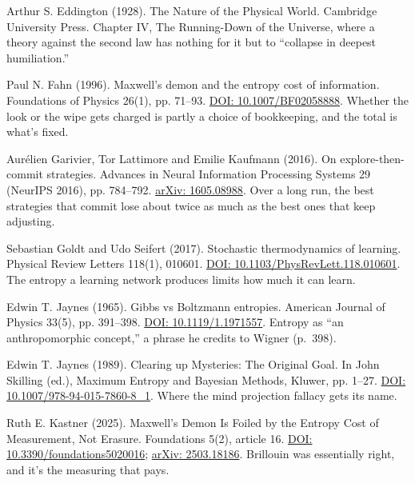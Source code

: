 \noindent Arthur S. Eddington (1928). The Nature of the Physical World. Cambridge University Press. Chapter IV, The Running-Down of the Universe, where a theory against the second law has nothing for it but to ``collapse in deepest humiliation.''
\par\medskip

\noindent Paul N. Fahn (1996). Maxwell's demon and the entropy cost of information. Foundations of Physics 26(1), pp. 71--93. \href{https://doi.org/10.1007/BF02058888}{DOI: 10.1007/BF02058888}. Whether the look or the wipe gets charged is partly a choice of bookkeeping, and the total is what's fixed.
\par\medskip

\noindent Aur\'elien Garivier, Tor Lattimore and Emilie Kaufmann (2016). On explore-then-commit strategies. Advances in Neural Information Processing Systems 29 (NeurIPS 2016), pp. 784--792. \href{https://arxiv.org/abs/1605.08988}{arXiv: 1605.08988}. Over a long run, the best strategies that commit lose about twice as much as the best ones that keep adjusting.
\par\medskip

\noindent Sebastian Goldt and Udo Seifert (2017). Stochastic thermodynamics of learning. Physical Review Letters 118(1), 010601. \href{https://doi.org/10.1103/PhysRevLett.118.010601}{DOI: 10.1103/PhysRevLett.118.010601}. The entropy a learning network produces limits how much it can learn.
\par\medskip

\noindent Edwin T. Jaynes (1965). Gibbs vs Boltzmann entropies. American Journal of Physics 33(5), pp. 391--398. \href{https://doi.org/10.1119/1.1971557}{DOI: 10.1119/1.1971557}. Entropy as ``an anthropomorphic concept,'' a phrase he credits to Wigner (p.~398).
\par\medskip

\noindent Edwin T. Jaynes (1989). Clearing up Mysteries: The Original Goal. In John Skilling (ed.), Maximum Entropy and Bayesian Methods, Kluwer, pp. 1--27. \href{https://doi.org/10.1007/978-94-015-7860-8_1}{DOI: 10.1007/978-94-015-7860-8\_1}. Where the mind projection fallacy gets its name.
\par\medskip

\noindent Ruth E. Kastner (2025). Maxwell's Demon Is Foiled by the Entropy Cost of Measurement, Not Erasure. Foundations 5(2), article 16. \href{https://doi.org/10.3390/foundations5020016}{DOI: 10.3390/foundations5020016}; \href{https://arxiv.org/abs/2503.18186}{arXiv: 2503.18186}. Brillouin was essentially right, and it's the measuring that pays.
\par\medskip

